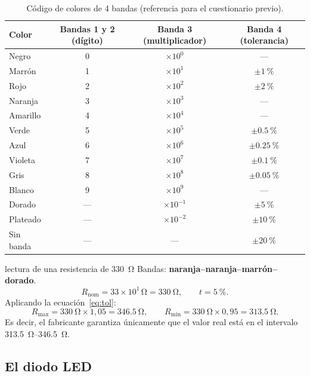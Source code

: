 \documentclass[11pt,a4paper]{article}
\begin{document}
\begin{table}[H]
    \centering
    \caption{Código de colores de 4 bandas (referencia para el cuestionario previo).}
    \label{tab:colores}
    \small
    \begin{tabular}{lccc}
    \toprule
    \textbf{Color} & \textbf{Bandas 1 y 2 (dígito)} & \textbf{Banda 3 (multiplicador)} &
    \textbf{Banda 4 (tolerancia)}\\
    \midrule
    Negro     & 0 & $\times 10^{0}$  & ---\\
    Marrón    & 1 & $\times 10^{1}$  & $\pm\qty{1}{\percent}$\\
    Rojo      & 2 & $\times 10^{2}$  & $\pm\qty{2}{\percent}$\\
    Naranja   & 3 & $\times 10^{3}$  & ---\\
    Amarillo  & 4 & $\times 10^{4}$  & ---\\
    Verde     & 5 & $\times 10^{5}$  & $\pm\qty{0.5}{\percent}$\\
    Azul      & 6 & $\times 10^{6}$  & $\pm\qty{0.25}{\percent}$\\
    Violeta   & 7 & $\times 10^{7}$  & $\pm\qty{0.1}{\percent}$\\
    Gris      & 8 & $\times 10^{8}$  & $\pm\qty{0.05}{\percent}$\\
    Blanco    & 9 & $\times 10^{9}$  & ---\\
    Dorado    & --- & $\times 10^{-1}$ & $\pm\qty{5}{\percent}$\\
    Plateado  & --- & $\times 10^{-2}$ & $\pm\qty{10}{\percent}$\\
    Sin banda & --- & ---              & $\pm\qty{20}{\percent}$\\
    \bottomrule
    \end{tabular}
\end{table}

\begin{ejemplo}{lectura de una resistencia de \qty{330}{\ohm}}
Bandas: \textbf{naranja--naranja--marrón--dorado}.
\[
    R_{\text{nom}} = 33 \times 10^{1}\,\unit{\ohm} = \qty{330}{\ohm},
    \qquad t = \qty{5}{\percent}.
\]
Aplicando la ecuación~\eqref{eq:tol}:
\[
    R_{\max}=\qty{330}{\ohm}\times 1{,}05=\qty{346.5}{\ohm},
    \qquad
    R_{\min}=\qty{330}{\ohm}\times 0{,}95=\qty{313.5}{\ohm}.
\]
Es decir, el fabricante garantiza únicamente que el valor real está en el intervalo
\qtyrange{313.5}{346.5}{\ohm}.
\end{ejemplo}

\FloatBarrier
\subsection{El diodo LED}
\end{document}
